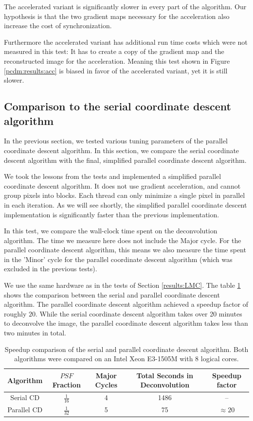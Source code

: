 The accelerated variant is significantly slower in every part of the algorithm. Our hypothesis is that the two gradient maps necessary for the acceleration also increase the cost of synchronization.

Furthermore the accelerated variant has additional run time costs which were not measured in this test: It has to create a copy of the gradient map and the reconstructed image for the acceleration. Meaning this test shown in Figure \ref{pcdm:results:acc} is biased in favor of the accelerated variant, yet it is still slower.


\subsection{Comparison to the serial coordinate descent algorithm}
In the previous section, we tested various tuning parameters of the parallel coordinate descent algorithm. In this section, we compare the serial coordinate descent algorithm with the final, simplified parallel coordinate descent algorithm.

We took the lessons from the tests and implemented a simplified parallel coordinate descent algorithm. It does not use gradient acceleration, and cannot group pixels into blocks. Each thread can only minimize a single pixel in parallel in each iteration. As we will see shortly, the simplified parallel coordinate descent implementation is significantly faster than the previous implementation.

In this test, we compare the wall-clock time spent on the deconvolution algorithm. The time we measure here does not include the Major cycle. For the parallel coordinate descent algorithm, this means we also measure the time spent in the 'Minor' cycle for the parallel coordinate descent algorithm (which was excluded in the previous tests).

We use the same hardware as in the tests of Section \ref{results:LMC}. The table \ref{pcdm:comp:table} shows the comparison between the serial and parallel coordinate descent algorithm. The parallel coordinate descent algorithm achieved a speedup factor of roughly $20$. While the serial coordinate descent algorithm takes over 20 minutes to deconvolve the image, the parallel coordinate descent algorithm takes less than two minutes in total.

\begin{table} [h]
	\centering
	\begin{tabular}{c | c | c | c | c}
		Algorithm &  $PSF$ Fraction & Major Cycles & Total Seconds in Deconvolution & Speedup factor\\ \hline
		Serial CD & $\frac{1}{16}$ & 4 & 1486 & --\\
		Parallel CD & $\frac{1}{32}$ & 5 & 75 & $\approx 20$ \\
	\end{tabular}
	\caption{Speedup comparison of the serial and parallel coordinate descent algorithm. Both algorithms were compared on an Intel Xeon E3-1505M with 8 logical cores.}
	\label{pcdm:comp:table}
\end{table}

